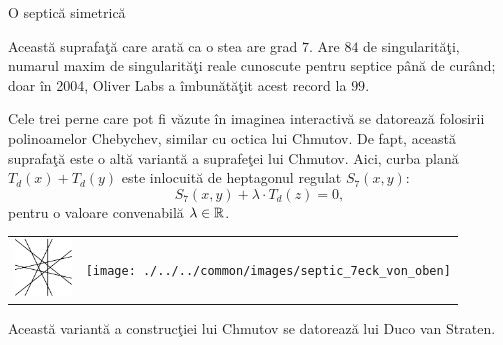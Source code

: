 \begin{surferPage}{O septic\u{a} simetric\u{a}}

     Aceast\u{a} suprafa\c{t}\u{a} care arat\u{a} ca o stea are grad $7$.
     Are $84$ de singularit\u{a}\c{t}i, numarul maxim de singularit\u{a}\c{t}i 
     reale cunoscute pentru septice p\^{a}n\u{a} de cur\^{a}nd; doar 
     \^{i}n 2004, Oliver Labs a \^{i}mbun\u{a}t\u{a}\c{t}it acest record la $99$.
     
  Cele trei perne care pot fi v\u{a}zute \^{i}n imaginea interactiv\u{a} 
    se datoreaz\u{a} folosirii polinoamelor Chebychev, similar cu octica lui Chmutov.
    De fapt, aceast\u{a} suprafa\c{t}\u{a} este o alt\u{a} variant\u{a} a suprafe\c{t}ei lui Chmutov. Aici,
    curba plan\u{a} $T_d(x)+T_d(y)$ este inlocuit\u{a} de heptagonul regulat $S_7(x,y)$: 
   \[S_7(x,y) + \lambda \cdot T_d(z) = 0,\]
    pentru o valoare convenabil\u{a} $\lambda\in{\mathbb R}$. 
      \vspace*{-0.3em}
    \begin{center}
      \begin{tabular}{c@{\qquad}c}
        \includegraphics[height=1.5cm]{./../../common/images/labsseptic1.pdf}
        &
        \texttt{[image: ./../../common/images/septic\_7eck\_von\_oben]}
      \end{tabular}
    \end{center}
    \vspace*{-0.3em}   
   Aceast\u{a} variant\u{a} a construc\c{t}iei lui Chmutov se datoreaz\u{a} lui Duco van Straten.

\end{surferPage}
